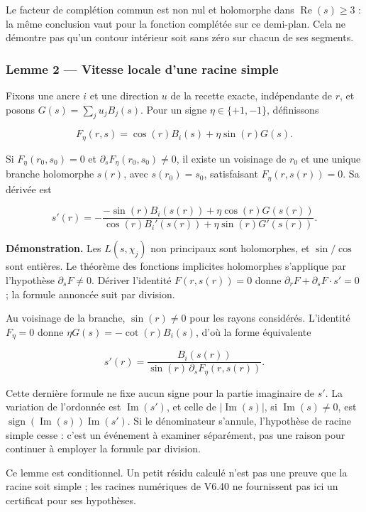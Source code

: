 \documentclass[
  10pt,
  a4paper,
]{article}
\begin{document}
Le facteur de complétion commun est non nul et holomorphe dans
\(\operatorname{Re}(s)\geq3\) : la même conclusion vaut pour la fonction
complétée sur ce demi-plan. Cela ne démontre pas qu'un contour intérieur
soit sans zéro sur chacun de ses segments.

\newpage

\hypertarget{lemme-2-vitesse-locale-dune-racine-simple}{%
\subsubsection{Lemme 2 --- Vitesse locale d'une racine
simple}\label{lemme-2-vitesse-locale-dune-racine-simple}}

Fixons une ancre \(i\) et une direction \(u\) de la recette exacte,
indépendante de \(r\), et posons \(G(s)=\sum_j u_jB_j(s)\). Pour un
signe \(\eta\in\{+1,-1\}\), définissons

\[
 F_\eta(r,s)=\cos(r)B_i(s)+\eta\sin(r)G(s).
\]

Si \(F_\eta(r_0,s_0)=0\) et \(\partial_sF_\eta(r_0,s_0)\neq0\), il
existe un voisinage de \(r_0\) et une unique branche holomorphe
\(s(r)\), avec \(s(r_0)=s_0\), satisfaisant \(F_\eta(r,s(r))=0\). Sa
dérivée est

\[
 s'(r)=-\frac{-\sin(r)B_i(s(r))+\eta\cos(r)G(s(r))}
 {\cos(r)B_i'(s(r))+\eta\sin(r)G'(s(r))}.
\]

\textbf{Démonstration.} Les \(L(s,\chi_j)\) non principaux sont
holomorphes, et \(\sin/\cos\) sont entières. Le théorème des fonctions
implicites holomorphes s'applique par l'hypothèse \(\partial_sF\neq0\).
Dériver l'identité \(F(r,s(r))=0\) donne
\(\partial_rF+\partial_sF\cdot s'=0\) ; la formule annoncée suit par
division.

Au voisinage de la branche, \(\sin(r)\neq0\) pour les rayons considérés.
L'identité \(F_\eta=0\) donne \(\eta G(s)=-\cot(r)B_i(s)\), d'où la
forme équivalente

\[
s'(r)=\frac{B_i(s(r))}{\sin(r)\,\partial_s F_\eta(r,s(r))}.
\]

Cette dernière formule ne fixe aucun signe pour la partie imaginaire de
\(s'\). La variation de l'ordonnée est \(\operatorname{Im}(s')\), et
celle de \(|\operatorname{Im}(s)|\), si \(\operatorname{Im}(s)\neq0\),
est \(\operatorname{sign}(\operatorname{Im}(s))\operatorname{Im}(s')\).
Si le dénominateur s'annule, l'hypothèse de racine simple cesse : c'est
un événement à examiner séparément, pas une raison pour continuer à
employer la formule par division.

Ce lemme est conditionnel. Un petit résidu calculé n'est pas une preuve
que la racine soit simple ; les racines numériques de V6.40 ne
fournissent pas ici un certificat pour ses hypothèses.
\end{document}
